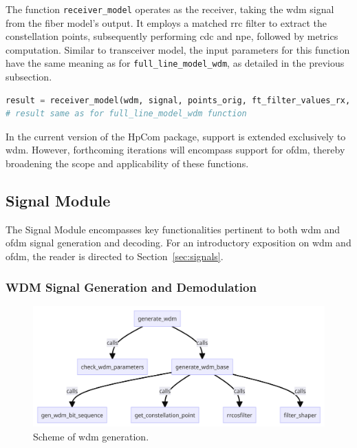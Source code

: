 The function \texttt{receiver\_model} operates as the receiver, taking the \acrshort{wdm} signal from the fiber model's output. It employs a matched \acrshort{rrc} filter to extract the constellation points, subsequently performing \acrfull{cdc} and \acrfull{npe}, followed by metrics computation. Similar to transceiver model, the input parameters for this function have the same meaning as for \texttt{full\_line\_model\_wdm}, as detailed in the previous subsection.

\begin{lstlisting}[language=Python, caption=Usage of \texttt{receiver\_model} function, label=lst:rx_model]
result = receiver_model(wdm, signal, points_orig, ft_filter_values_rx, channels_type='all', verbose=0, optimise='not')
# result same as for full_line_model_wdm function
\end{lstlisting}

In the current version of the HpCom package, support is extended exclusively to \acrshort{wdm}. However, forthcoming iterations will encompass support for \acrshort{ofdm}, thereby broadening the scope and applicability of these functions.


\subsection{Signal Module}
The Signal Module encompasses key functionalities pertinent to both \acrfull{wdm} and \acrfull{ofdm} signal generation and decoding. For an introductory exposition on \acrshort{wdm} and \acrshort{ofdm}, the reader is directed to Section~\ref{sec:signals}.


\subsubsection{WDM Signal Generation and Demodulation}

\begin{figure}[t]
   \centering
        \includegraphics[width=0.8\linewidth]{images/hpcom/wdm_generation.png}
    \caption{Scheme of \acrshort{wdm} generation.}
    \label{fig:wdm_generation}
\end{figure}

